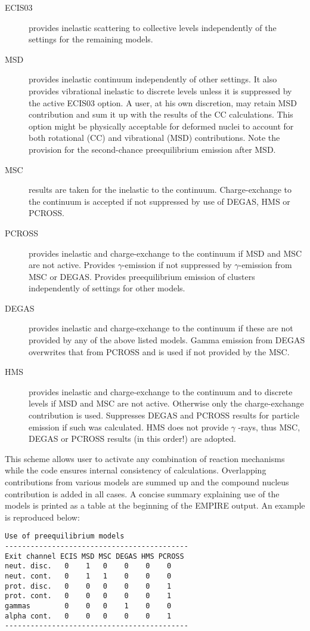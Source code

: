 \begin{description}
\item[ECIS03] provides inelastic scattering to collective levels
independently of the settings for the remaining models.

\item[MSD] provides inelastic continuum independently of other settings. It
also provides vibrational inelastic to discrete levels unless it is
suppressed by the active ECIS03 option. A user, at his own discretion, may
retain MSD contribution and sum it up with the results of the CC
calculations. This option might be physically acceptable for deformed nuclei
to account for both rotational (CC) and vibrational (MSD) contributions.
Note the provision for the second-chance preequilibrium emission after MSD.

\item[MSC] results are taken for the inelastic to the continuum.
Charge-exchange to the continuum is accepted if not suppressed by use of
DEGAS, HMS or PCROSS.

\item[PCROSS] provides inelastic and charge-exchange to the continuum if MSD
and MSC are not active. Provides $\gamma$-emission if not suppressed by $%
\gamma$-emission from MSC or DEGAS. Provides preequilibrium emission of
clusters independently of settings for other models.

\item[DEGAS] provides inelastic and charge-exchange to the continuum if
these are not provided by any of the above listed models. Gamma emission
from DEGAS overwrites that from PCROSS and is used if not provided by the
MSC.

\item[HMS] provides inelastic and charge-exchange to the continuum and to
discrete levels if MSD and MSC are not active. Otherwise only the
charge-exchange contribution is used. Suppresses DEGAS and PCROSS results
for particle emission if such was calculated. HMS does not provide $\gamma$%
-rays, thus MSC, DEGAS or PCROSS results (in this order!) are adopted.
\end{description}

This scheme allows user to activate any combination of reaction mechanisms
while the code ensures internal consistency of calculations. Overlapping
contributions from various models are summed up and the compound nucleus
contribution is added in all cases. A concise summary explaining use of the
models is printed as a table at the beginning of the EMPIRE output. An
example is reproduced below:
\begin{verbatim}
Use of preequilibrium models
-------------------------------------------
Exit channel ECIS MSD MSC DEGAS HMS PCROSS
neut. disc.   0    1   0    0    0    0
neut. cont.   0    1   1    0    0    0
prot. disc.   0    0   0    0    0    1
prot. cont.   0    0   0    0    0    1
gammas        0    0   0    1    0    0
alpha cont.   0    0   0    0    0    1
-------------------------------------------
\end{verbatim}

